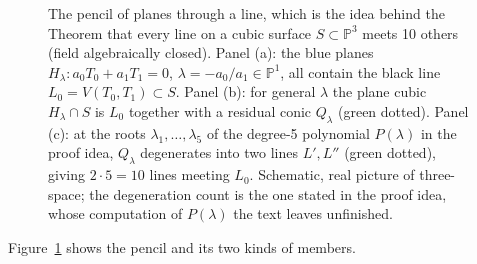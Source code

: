 \documentclass[12pt]{article}
\numberwithin{equation}{section}
\theoremstyle{definition}
\theoremstyle{remark}
\newcommand{\PP}{\mathbb{P}}
\begin{document}
\begin{figure}[H]
\centering

\caption{The pencil of planes through a line, which is the idea behind the Theorem that every line on a cubic surface $S\subset\PP^3$ meets 10 others (field algebraically closed). Panel (a): the blue planes $H_\lambda\colon a_0T_0+a_1T_1=0$, $\lambda=-a_0/a_1\in\PP^1$, all contain the black line $L_0=V(T_0,T_1)\subset S$. Panel (b): for general $\lambda$ the plane cubic $H_\lambda\cap S$ is $L_0$ together with a residual conic $Q_\lambda$ (green dotted). Panel (c): at the roots $\lambda_1,\ldots,\lambda_5$ of the degree-5 polynomial $P(\lambda)$ in the proof idea, $Q_\lambda$ degenerates into two lines $L',L''$ (green dotted), giving $2\cdot5=10$ lines meeting $L_0$. Schematic, real picture of three-space; the degeneration count is the one stated in the proof idea, whose computation of $P(\lambda)$ the text leaves unfinished.}\label{fig:pencil-through-line}
\end{figure}
Figure~\ref{fig:pencil-through-line} shows the pencil and its two kinds of members.
\end{document}
